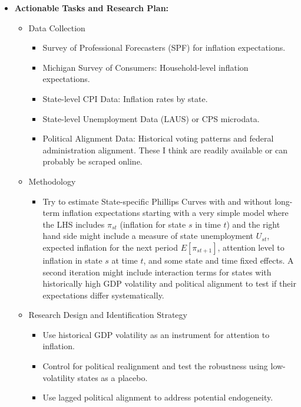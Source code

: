 \documentclass[10pt]{article}
\begin{document}
\begin{itemize}
\item \textbf{Actionable Tasks and Research Plan:}

\begin{itemize}
\item{Data Collection}
\begin{itemize}
    \item Survey of Professional Forecasters (SPF) for inflation expectations.
    \item Michigan Survey of Consumers: Household-level inflation expectations.
    \item State-level CPI Data: Inflation rates by state.
    \item State-level Unemployment Data (LAUS) or CPS microdata.
    \item Political Alignment Data: Historical voting patterns and federal administration alignment. These I think are readily available or can probably be scraped online. 
\end{itemize}

\item{Methodology}
\begin{itemize}
    \item Try to estimate State-specific Phillips Curves with and without long-term inflation expectations starting with a very simple model where the LHS includes $\pi_{st}$ (inflation for state $s$ in time $t$) and the right hand side might include a measure of state unemployment $U_{st}$, expected inflation for the next period $E[\pi_{st+1}]$, attention level to inflation in state $s$ at time $t$, and some state and time fixed effects. A second iteration might include interaction terms for states with historically high GDP volatility and political alignment to test if their expectations differ systematically. 
\end{itemize}

\item{Research Design and Identification Strategy}
\begin{itemize}
    \item Use historical GDP volatility as an instrument for attention to inflation.
    \item Control for political realignment and test the robustness using low-volatility states as a placebo.
    \item Use lagged political alignment to address potential endogeneity.
\end{itemize}

\end{itemize}





\end{itemize}
\end{document}
